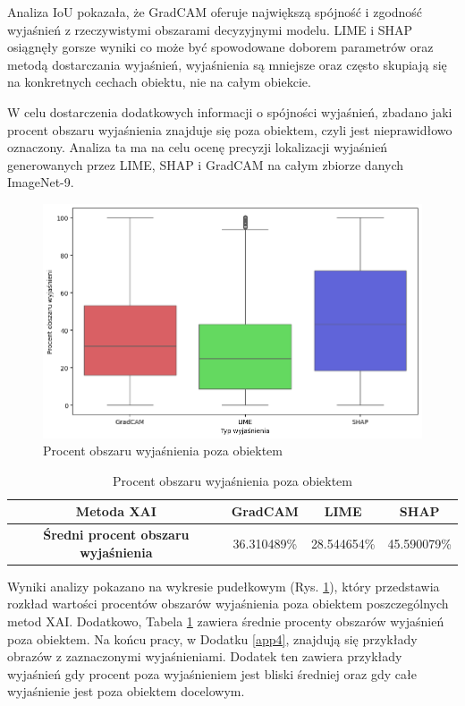 Analiza IoU pokazała, że GradCAM oferuje największą spójność i zgodność wyjaśnień z rzeczywistymi obszarami decyzyjnymi modelu.
LIME i SHAP osiągnęły gorsze wyniki co może być spowodowane doborem parametrów oraz metodą dostarczania wyjaśnień, wyjaśnienia są mniejsze oraz często skupiają się na konkretnych cechach obiektu, nie na całym obiekcie.

\vspace{1cm}

W celu dostarczenia dodatkowych informacji o spójności wyjaśnień, zbadano jaki procent obszaru wyjaśnienia znajduje się poza obiektem, czyli jest nieprawidłowo oznaczony.
Analiza ta ma na celu ocenę precyzji lokalizacji wyjaśnień generowanych przez LIME, SHAP i GradCAM na całym zbiorze danych ImageNet-9.

\begin{figure}[h]
	\centering\includegraphics[width=.9\textwidth]{img/areaincorrect}
	\caption{Procent obszaru wyjaśnienia poza obiektem}  \label{rys:areaincorrect}
\end{figure}

\begin{table}[h]
	\centering
	\begin{tabular}{|c|c|c|c|}
		\hline
		\textbf{Metoda XAI}                          & \textbf{GradCAM} & \textbf{LIME} & \textbf{SHAP} \\
		\hline
		\textbf{Średni procent obszaru wyjaśnienia } & 36.310489\%      & 28.544654\%   & 45.590079\%   \\
		\hline
	\end{tabular}
	\caption{Procent obszaru wyjaśnienia poza obiektem}
	\label{tab:areaincorrect}
\end{table}

Wyniki analizy pokazano na wykresie pudełkowym (Rys. \ref{rys:areaincorrect}), który przedstawia rozkład wartości procentów obszarów wyjaśnienia poza obiektem poszczególnych metod XAI.
Dodatkowo, Tabela \ref{tab:areaincorrect} zawiera średnie procenty obszarów wyjaśnień poza obiektem.
Na końcu pracy, w Dodatku \ref{app4}, znajdują się przykłady obrazów z zaznaczonymi wyjaśnieniami.
Dodatek ten zawiera przykłady wyjaśnień gdy procent poza wyjaśnieniem jest bliski średniej oraz gdy całe wyjaśnienie jest poza obiektem docelowym.

